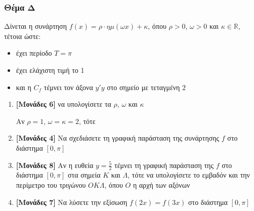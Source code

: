 \documentclass[12pt]{article}
\begin{document}
\section*{Θέμα Δ}
\noindent
Δίνεται η συνάρτηση $f(x)=ρ\cdot ημ(ωx)+κ$, όπου $ρ>0$, $ω>0$ και $κ\in \mathbb{R}$, τέτοια ώστε:
\begin{itemize}
 \item έχει περίοδο $Τ=π$
 \item έχει ελάχιστη τιμή το 1
 \item και η $C_f$ τέμνει τον άξονα $y'y$ στο σημείο με τεταγμένη $2$
\end{itemize}
\begin{enumerate}
 \item \textbf{[Μονάδες 6]} να υπολογίσετε τα $ρ$, $ω$ και $κ$

       Αν $ρ=1$, $ω=κ=2$, τότε

 \item \textbf{[Μονάδες 4]} Να σχεδιάσετε τη γραφική παράσταση της συνάρτησης $f$ στο διάστημα $[0,π]$
 \item \textbf{[Μονάδες 8]} Αν η ευθεία $y=\frac{5}{2}$ τέμνει τη γραφική παράσταση της $f$ στο διάστημα $[0,π]$ στα σημεία $Κ$ και $Λ$, τότε να υπολογίσετε το εμβαδόν και την περίμετρο του τριγώνου $ΟΚΛ$, όπου $Ο$ η αρχή των αξόνων
 \item \textbf{[Μονάδες 7]} Να λύσετε την εξίσωση $f(2x)=f(3x)$ στο διάστημα $[0,π]$
\end{enumerate}

\vspace{3\baselineskip}

\part*{}
\end{document}
